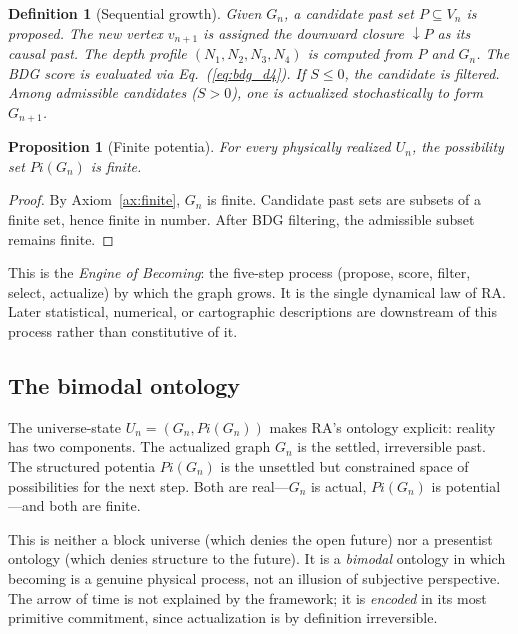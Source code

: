 \documentclass[11pt]{article}
\def\Pi{Pi}%
\newtheorem{definition}{Definition}
\newtheorem{proposition}{Proposition}
\newcommand{\Pot}{\Pi}
\begin{document}
\begin{definition}[Sequential growth]
Given $G_n$, a candidate past set $P\subseteq V_n$ is proposed. The new vertex $v_{n+1}$ is assigned the downward closure $\downarrow\!P$ as its causal past. The depth profile $(N_1,N_2,N_3,N_4)$ is computed from $P$ and $G_n$. The BDG score is evaluated via Eq.~(\ref{eq:bdg_d4}). If $S\le 0$, the candidate is filtered. Among admissible candidates ($S>0$), one is actualized stochastically to form $G_{n+1}$.
\end{definition}

\begin{proposition}[Finite potentia]
For every physically realized $U_n$, the possibility set $\Pot(G_n)$ is finite.
\end{proposition}
\begin{proof}
By Axiom~\ref{ax:finite}, $G_n$ is finite. Candidate past sets are subsets of a finite set, hence finite in number. After BDG filtering, the admissible subset remains finite.
\end{proof}

This is the \emph{Engine of Becoming}: the five-step process (propose, score, filter, select, actualize) by which the graph grows. It is the single dynamical law of RA. Later statistical, numerical, or cartographic descriptions are downstream of this process rather than constitutive of it.

\subsection{The bimodal ontology}

The universe-state $U_n=(G_n,\Pot(G_n))$ makes RA's ontology explicit: reality has two components. The actualized graph $G_n$ is the settled, irreversible past. The structured potentia $\Pot(G_n)$ is the unsettled but constrained space of possibilities for the next step. Both are real---$G_n$ is actual, $\Pot(G_n)$ is potential---and both are finite.

This is neither a block universe (which denies the open future) nor a presentist ontology (which denies structure to the future). It is a \emph{bimodal} ontology in which becoming is a genuine physical process, not an illusion of subjective perspective. The arrow of time is not explained by the framework; it is \emph{encoded} in its most primitive commitment, since actualization is by definition irreversible.

\end{document}
